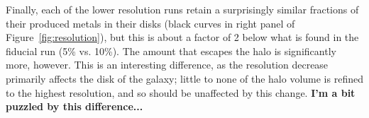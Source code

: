 \documentclass[twocolumn]{aastex61}
\begin{document}
Finally, each of the lower resolution runs retain a surprisingly similar fractions of their produced metals in their disks (black curves in right panel of Figure~\ref{fig:resolution}), but this is about a factor of 2 below what is found in the fiducial run (5\% vs. 10\%). The amount that escapes the halo is significantly more, however. This is an interesting difference, as the resolution decrease primarily affects the disk of the galaxy; little to none of the halo volume is refined to the highest resolution, and so should be unaffected by this change. \textbf{I'm a bit puzzled by this difference...}









\end{document}
